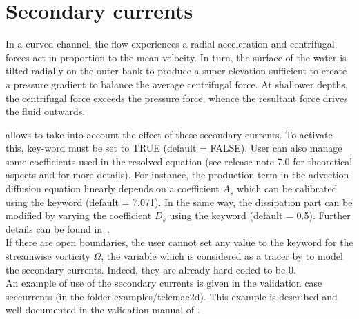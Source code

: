 \chapter{Secondary currents}
\label{ch:sec:curr}
In a curved channel, the flow experiences a radial acceleration and centrifugal
forces act in proportion to the mean velocity.
In turn, the surface of the water is tilted radially on the outer bank
to produce a super-elevation sufficient to create a pressure gradient 
to balance the average centrifugal force.
At shallower depths, the centrifugal force exceeds the pressure force,
whence the resultant force drives the fluid outwards.

 allows to take into account the effect of these secondary currents.
To activate this, key-word  must be set to TRUE
(default = FALSE).
User can also manage some coefficients used in the resolved equation
(see release note 7.0 for theoretical aspects and for more details).
For instance, the production term in the advection-diffusion equation linearly
depends on a coefficient $A_s$ which can be calibrated using the keyword
 (default = 7.071).
In the same way, the dissipation part can be modified by varying
the coefficient $D_{s}$ using the keyword
 (default = 0.5).
Further details can be found in~\cite{wang2014secondary}.
\\

If there are open boundaries, the user cannot set any value to the keyword
 for the streamwise vorticity $\Omega$,
the variable which is considered as a tracer by  to model the
secondary currents.
Indeed, they are already hard-coded to be 0.\\

An example of use of the secondary currents is given in the validation case
seccurrents (in the folder examples/telemac2d). 
This example is described and well documented in the validation manual of
.
